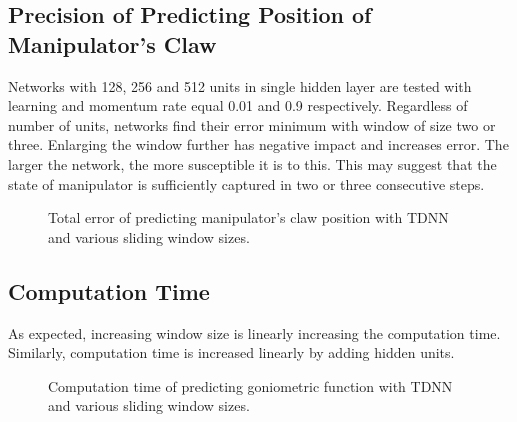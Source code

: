 \documentclass[12pt,oneside]{fithesis2}
\begin{document}
\subsection{Precision of Predicting Position of Manipulator's Claw}
Networks with 128, 256 and 512 units in single hidden layer are tested with learning and momentum rate equal 0.01 and 0.9 respectively. Regardless of number of units, networks find their error minimum with window of size two or three. Enlarging the  window further has negative impact and increases error. The larger the network, the more susceptible it is to this. This may suggest that the state of manipulator is sufficiently captured in two or three consecutive steps.

\begin{figure}[H]
\centering
\caption{Total error of predicting manipulator's claw position with TDNN and various sliding window sizes.}
\end{figure}

\subsection{Computation Time}
As expected, increasing window size is linearly increasing the computation time. Similarly, computation time is increased linearly by adding hidden units.

\begin{figure}[H]
\centering
\caption{Computation time of predicting goniometric function with TDNN and various sliding window sizes.}
\end{figure}
\end{document}
